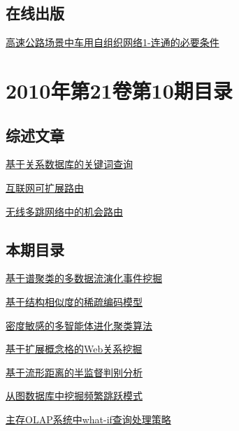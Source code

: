 \documentclass[a4paper]{article}
\begin{document}
\subsection{在线出版}
\href{http://www.jos.org.cn/ch/reader/download_pdf.aspx?file_no=3681&year_id=2010&quarter_id=11&falg=1}{高速公路场景中车用自组织网络1-连通的必要条件}


\section{\textbf{2010年第21卷第10期目录}}
\subsection{综述文章}
\href{http://www.jos.org.cn/ch/reader/download_pdf.aspx?file_no=3913&year_id=2010&quarter_id=10&falg=1}{基于关系数据库的关键词查询}

\href{http://www.jos.org.cn/ch/reader/download_pdf.aspx?file_no=3911&year_id=2010&quarter_id=10&falg=1}{互联网可扩展路由}

\href{http://www.jos.org.cn/ch/reader/download_pdf.aspx?file_no=3740&year_id=2010&quarter_id=10&falg=1}{无线多跳网络中的机会路由}

\subsection{本期目录}
\href{http://www.jos.org.cn/ch/reader/download_pdf.aspx?file_no=3745&year_id=2010&quarter_id=10&falg=1}{基于谱聚类的多数据流演化事件挖掘}

\href{http://www.jos.org.cn/ch/reader/download_pdf.aspx?file_no=3675&year_id=2010&quarter_id=10&falg=1}{基于结构相似度的稀疏编码模型}

\href{http://www.jos.org.cn/ch/reader/download_pdf.aspx?file_no=3635&year_id=2010&quarter_id=10&falg=1}{密度敏感的多智能体进化聚类算法}

\href{http://www.jos.org.cn/ch/reader/download_pdf.aspx?file_no=3662&year_id=2010&quarter_id=10&falg=1}{基于扩展概念格的Web关系挖掘}

\href{http://www.jos.org.cn/ch/reader/download_pdf.aspx?file_no=3629&year_id=2010&quarter_id=10&falg=1}{基于流形距离的半监督判别分析}

\href{http://www.jos.org.cn/ch/reader/download_pdf.aspx?file_no=3831&year_id=2010&quarter_id=10&falg=1}{从图数据库中挖掘频繁跳跃模式}

\href{http://www.jos.org.cn/ch/reader/download_pdf.aspx?file_no=3679&year_id=2010&quarter_id=10&falg=1}{主存OLAP系统中what-if查询处理策略}
\end{document}
